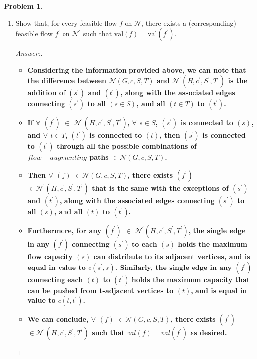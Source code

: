 \documentclass[11pt]{article}
\theoremstyle{definition}
\theoremstyle{definition}
\newtheorem{required}{Problem}
\theoremstyle{definition}
\begin{document}
\begin{required}
\begin{enumerate}[label=(\alph*)]
\subsubsection{Problem 5\ref{S113a}}
\item \label{S113a} Show that, for every feasible flow $f$ on $\mathcal{N}$, there exists a (corresponding) feasible flow $f^{\prime}$ on $\mathcal{N}^{\prime}$ such that $\text{val}(f) = \text{val}(f^{\prime})$. 

\begin{proof}[Answer:] \
\begin{itemize}
\item \textbf{Considering the information provided above, we can note that the difference between $\mathcal{N}(G, c, S, T)$ and $\mathcal{N}^{\prime}(H, c^{\prime}, S^{\prime}, T^{\prime})$ is the addition of $(s^{\prime})$ and $(t^{\prime})$, along with the associated edges connecting $(s^{\prime})$ to all $(s \in S)$, and all $(t \in T)$ to $(t^{\prime})$.} \\
\item \textbf{If $\forall$ $(f^{\prime})$ $\in$ $\mathcal{N}^{\prime}(H, c^{\prime}, S^{\prime}, T^{\prime})$, $\forall$ $s \in S$, $(s^{\prime})$ is connected to $(s)$, and $\forall$ $t \in T$, $(t^{\prime})$ is connected to $(t)$, then $(s^{\prime})$ is connected to $(t^{\prime})$ through all the possible combinations of $flow-augmenting$ paths $\in \mathcal{N}(G, c, S, T)$.} \\
\item \textbf{Then $\forall$ $(f)$ $\in \mathcal{N}(G, c, S, T)$, there exists $(f^{\prime})$ $\in \mathcal{N}^{\prime}(H, c^{\prime}, S^{\prime}, T^{\prime})$ that is the same with the exceptions of $(s^{\prime})$ and $(t^{\prime})$, along with the associated edges connecting $(s^{\prime})$ to all $(s)$, and all $(t)$ to $(t^{\prime})$.} \\
\item \textbf{Furthermore, for any $(f^{\prime})$ $\in$ $\mathcal{N}^{\prime}(H, c^{\prime}, S^{\prime}, T^{\prime})$, the single edge in any $(f^{\prime})$ connecting $(s^{\prime})$ to each $(s)$ holds the maximum flow capacity $(s)$ can distribute to its adjacent vertices, and is equal in value to $c(s^{\prime}, s)$. Similarly, the single edge in any $(f^{\prime})$ connecting each $(t)$ to $(t^{\prime})$ holds the maximum capacity that can be pushed from t-adjacent vertices to $(t)$, and is equal in value to $c(t, t^{\prime})$.} \\
\item \textbf{We can conclude, $\forall$ $(f)$ $\in \mathcal{N}(G, c, S, T)$, there exists $(f^{\prime})$ $\in \mathcal{N}^{\prime}(H, c^{\prime}, S^{\prime}, T^{\prime})$ such that $val(f) = val(f^{\prime})$ as desired.}
\end{itemize}
\end{proof}




\end{enumerate}
\end{required}
\end{document}
